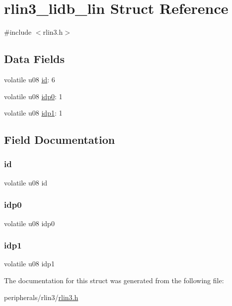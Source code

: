 \hypertarget{structrlin3__lidb__lin}{}\section{rlin3\+\_\+lidb\+\_\+lin Struct Reference}
\label{structrlin3__lidb__lin}


{\ttfamily \#include $<$rlin3.\+h$>$}

\subsection*{Data Fields}
\begin{DoxyCompactItemize}
\item 
volatile u08 \mbox{\hyperlink{structrlin3__lidb__lin_a3ae97311ba580a35b3502f9f36f303ee}{id}}\+: 6
\item 
volatile u08 \mbox{\hyperlink{structrlin3__lidb__lin_a3e3db7afb689ac44461cdbcba2a5376d}{idp0}}\+: 1
\item 
volatile u08 \mbox{\hyperlink{structrlin3__lidb__lin_a9d2dcb8b86c3bdb7fd3bec5632449ac5}{idp1}}\+: 1
\end{DoxyCompactItemize}


\subsection{Field Documentation}
\mbox{\label{structrlin3__lidb__lin_a3ae97311ba580a35b3502f9f36f303ee}} 
\subsubsection{\texorpdfstring{id}{id}}
{\footnotesize\ttfamily volatile u08 id}

\mbox{\label{structrlin3__lidb__lin_a3e3db7afb689ac44461cdbcba2a5376d}} 
\subsubsection{\texorpdfstring{idp0}{idp0}}
{\footnotesize\ttfamily volatile u08 idp0}

\mbox{\label{structrlin3__lidb__lin_a9d2dcb8b86c3bdb7fd3bec5632449ac5}} 
\subsubsection{\texorpdfstring{idp1}{idp1}}
{\footnotesize\ttfamily volatile u08 idp1}



The documentation for this struct was generated from the following file\+:\begin{DoxyCompactItemize}
\item 
peripherals/rlin3/\mbox{\hyperlink{rlin3_8h}{rlin3.\+h}}\end{DoxyCompactItemize}
